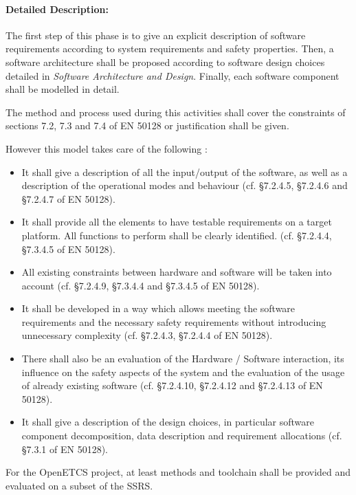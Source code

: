 \paragraph{Detailed Description:}
\label{sec:sw-req-deta-descr}

The first step of this phase is to give an explicit description of software requirements according to system requirements and safety properties.  Then, a software architecture shall be proposed according to software design choices detailed in  \textit{Software Architecture and Design}.
Finally, each software component shall be modelled in detail.

The method and process used during this activities shall cover the constraints of sections 7.2, 7.3 and 7.4 of EN 50128 or justification shall be given.


However this model takes care of the following :

\begin{itemize}
\item It shall give a description of all the input/output of the software, as well as a description of the operational modes and behaviour (cf. §7.2.4.5,  §7.2.4.6 and  §7.2.4.7 of EN 50128). 
\item It shall provide all the elements to have testable requirements on a target platform. All functions to perform shall be clearly identified. (cf. §7.2.4.4, §7.3.4.5  of EN 50128).
\item All existing constraints between hardware and software will be taken into account (cf. §7.2.4.9, §7.3.4.4 and §7.3.4.5 of EN 50128).
\item It shall be developed in a way which allows meeting the software
requirements and the necessary safety requirements without introducing
unnecessary complexity (cf. §7.2.4.3,  §7.2.4.4  of EN 50128).
\item There shall also be an evaluation of the
Hardware / Software interaction, its influence on the safety aspects of the system and the
evaluation of the usage of already existing software  (cf. §7.2.4.10,  §7.2.4.12 and §7.2.4.13  of EN 50128).
\item It shall give a  description of the design choices, in particular software component decomposition, data description and requirement allocations (cf. §7.3.1 of EN 50128).
\end{itemize}

For the OpenETCS project, at least methods and toolchain shall be provided and evaluated on a subset of the SSRS.


